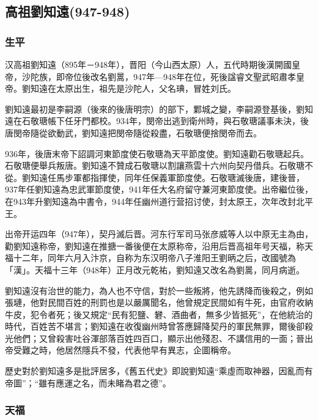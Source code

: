 
\subsection{高祖劉知遠\tiny(947-948)}

\subsubsection{生平}

汉高祖劉知遠（895年－948年），晋阳（今山西太原）人，五代時期後漢開國皇帝，沙陀族，即帝位後改名劉暠，947年—948年在位，死後諡睿文聖武昭肅孝皇帝。劉知遠在太原出生，祖先是沙陀人，父名琠，冒姓刘氏。

劉知遠最初是李嗣源（後來的後唐明宗）的部下，鄴城之變，李嗣源登基後，劉知遠在石敬瑭帳下任牙門都校。934年，閔帝出逃到衛州時，與石敬瑭議事未決，後唐閔帝隨從欲動武，劉知遠把閔帝隨從殺盡，石敬瑭便捨閔帝而去。

936年，後唐末帝下詔調河東節度使石敬瑭為天平節度使。劉知遠勸石敬瑭起兵。石敬瑭便舉兵叛唐。劉知遠不贊成石敬瑭以割讓燕雲十六州向契丹借兵。石敬瑭不從。劉知遠任馬步軍都指揮使，同年任保義軍節度使。石敬瑭滅後唐，建後晉，937年任劉知遠為忠武軍節度使，941年任大名府留守兼河東節度使。出帝繼位後，在943年升劉知遠為中書令，944年任幽州道行营招讨使，封太原王，次年改封北平王。

出帝开运四年（947年），契丹滅后晋。河东行军司马张彦威等人以中原无主為由，勸劉知遠称帝，劉知遠在推搪一番後便在太原称帝，沿用后晋高祖年号天福，称天福十二年，同年六月入汴京，自称为东汉明帝八子淮阳王劉昞之后，改國號為「漢」。天福十三年（948年）正月改元乾祐，劉知遠又改名為劉暠，同月病逝。

劉知遠沒有治世的能力，為人也不守信，對於一些叛將，他先誘降而後殺之，例如張璉，他對民間百姓的刑罰也是以嚴厲聞名，他曾規定民間如有牛死，由官府收納牛皮，犯令者死；後又規定“民有犯鹽、礬、酒曲者，無多少皆抵死”，在他統治的時代，百姓苦不堪言；劉知遠在收復幽州時曾答應歸降契丹的軍民無罪，爾後卻殺光他們；又曾殺害吐谷渾部落百姓四百口，顯示出他殘忍、不講信用的一面；晉出帝受難之時，他居然隱兵不發，代表他早有異志，企圖稱帝。

歷史對於劉知遠多是批評居多，《舊五代史》即說劉知遠“乘虛而取神器，因亂而有帝圖”；“雖有應運之名，而未睹為君之德”。


\subsubsection{天福}

